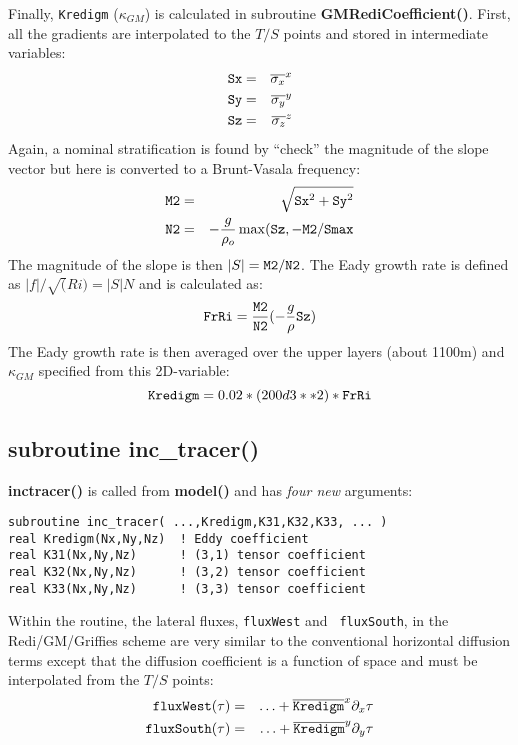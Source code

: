 Finally, {\tt Kredigm} ($\kappa_{GM}$) is calculated in subroutine
{\bf GMRediCoefficient()}. First, all the gradients are interpolated
to the $T/S$ points and stored in intermediate variables:
\begin{eqnarray*}
\mbox{\tt Sx} & = & \overline{ \sigma_x }^x \\
\mbox{\tt Sy} & = & \overline{ \sigma_y }^y \\
\mbox{\tt Sz} & = & \overline{ \sigma_z }^z
\end{eqnarray*}
Again, a nominal stratification is found by ``check'' the magnitude of
the slope vector but here is converted to a Brunt-Vasala frequency:
\begin{eqnarray*}
{\tt M2} & = & \sqrt{ {\tt Sx}^2 + {\tt Sy}^2} \\
{\tt N2} & = & - \frac{g}{\rho_o} \max ( {\tt Sz} , -{\tt M2 / Smax}
\end{eqnarray*}
The magnitude of the slope is then $|S| = {\tt M2}/{\tt N2}$. The Eady
growth rate is defined as $|f|/\sqrt(Ri) = |S| N$ and is calculated
as:
\begin{displaymath}
{\tt FrRi} = \frac{\tt M2}{\tt N2} ( - \frac{g}{\rho} {\tt Sz} )
\end{displaymath}
The Eady growth rate is then averaged over the upper layers (about
1100m) and $\kappa_{GM}$ specified from this 2D-variable:
\begin{displaymath}
{\tt Kredigm} = 0.02 * (200d3 **2) * {\tt FrRi}
\end{displaymath}

\subsection{subroutine inc\_tracer()}

{\bf inc\-tracer()} is called from {\bf model()} and has {\em four
new} arguments:
\begin{verbatim}
subroutine inc_tracer( ...,Kredigm,K31,K32,K33, ... )
real Kredigm(Nx,Ny,Nz)  ! Eddy coefficient
real K31(Nx,Ny,Nz)      ! (3,1) tensor coefficient
real K32(Nx,Ny,Nz)      ! (3,2) tensor coefficient
real K33(Nx,Ny,Nz)      ! (3,3) tensor coefficient
\end{verbatim}

Within the routine, the lateral fluxes, {\tt fluxWest} and {\tt
fluxSouth}, in the Redi/GM/Griffies scheme are very similar to the
conventional horizontal diffusion terms except that the diffusion
coefficient is a function of space and must be interpolated from the
$T/S$ points:
\begin{eqnarray*}
{\tt fluxWest}(\tau) & = & \ldots +
\overline{\tt Kredigm}^x \partial_x \tau \\
{\tt fluxSouth}(\tau) & = & \ldots +
\overline{\tt Kredigm}^y \partial_y \tau
\end{eqnarray*}

